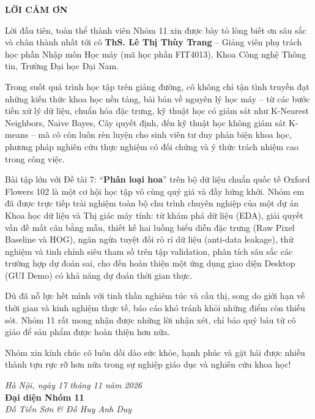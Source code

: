 \documentclass[../DoAn.tex]{subfiles}
\begin{document}
\begin{center}
    \Large{\textbf{LỜI CẢM ƠN}}
\end{center}
\vspace{0.8cm}

Lời đầu tiên, toàn thể thành viên Nhóm 11 xin được bày tỏ lòng biết ơn sâu sắc và chân thành nhất tới cô \textbf{ThS. Lê Thị Thùy Trang} -- Giảng viên phụ trách học phần Nhập môn Học máy (mã học phần FIT4013), Khoa Công nghệ Thông tin, Trường Đại học Đại Nam.

Trong suốt quá trình học tập trên giảng đường, cô không chỉ tận tình truyền đạt những kiến thức khoa học nền tảng, bài bản về nguyên lý học máy -- từ các bước tiền xử lý dữ liệu, chuẩn hóa đặc trưng, kỹ thuật học có giám sát như K-Nearest Neighbors, Naive Bayes, Cây quyết định, đến kỹ thuật học không giám sát K-means -- mà cô còn luôn rèn luyện cho sinh viên tư duy phản biện khoa học, phương pháp nghiên cứu thực nghiệm có đối chứng và ý thức trách nhiệm cao trong công việc.

Bài tập lớn với Đề tài 7: ``\textbf{Phân loại hoa}'' trên bộ dữ liệu chuẩn quốc tế Oxford Flowers 102 là một cơ hội học tập vô cùng quý giá và đầy hứng khởi. Nhóm em đã được trực tiếp trải nghiệm toàn bộ chu trình chuyên nghiệp của một dự án Khoa học dữ liệu và Thị giác máy tính: từ khám phá dữ liệu (EDA), giải quyết vấn đề mất cân bằng mẫu, thiết kế hai luồng biểu diễn đặc trưng (Raw Pixel Baseline và HOG), ngăn ngừa tuyệt đối rò rỉ dữ liệu (anti-data leakage), thử nghiệm và tinh chỉnh siêu tham số trên tập validation, phân tích sâu sắc các trường hợp dự đoán sai, cho đến hoàn thiện một ứng dụng giao diện Desktop (GUI Demo) có khả năng dự đoán thời gian thực.

Dù đã nỗ lực hết mình với tinh thần nghiêm túc và cầu thị, song do giới hạn về thời gian và kinh nghiệm thực tế, báo cáo khó tránh khỏi những điểm còn thiếu sót. Nhóm 11 rất mong nhận được những lời nhận xét, chỉ bảo quý báu từ cô giáo để sản phẩm được hoàn thiện hơn nữa.

Nhóm xin kính chúc cô luôn dồi dào sức khỏe, hạnh phúc và gặt hái được nhiều thành tựu rực rỡ hơn nữa trong sự nghiệp giáo dục và nghiên cứu khoa học!

\begin{flushright}
\textit{Hà Nội, ngày 17 tháng 11 năm 2026}\\
\textbf{Đại diện Nhóm 11}\\[0.2cm]
\textit{Đỗ Tiến Sơn \& Đỗ Huy Anh Duy}
\end{flushright}
\end{document}
